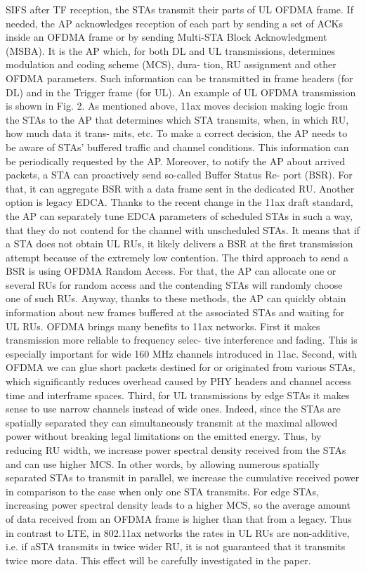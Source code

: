 SIFS after TF reception, the STAs
transmit their parts of UL OFDMA frame. If needed, the
AP acknowledges reception of each part by sending a set of
ACKs inside an OFDMA frame or by sending Multi-STA
Block Acknowledgment (MSBA).
It is the AP which, for both DL and UL transmissions,
determines modulation and coding scheme (MCS), dura-
tion, RU assignment and other OFDMA parameters. Such
information can be transmitted in frame headers (for DL)
and in the Trigger frame (for UL). An example of UL
OFDMA transmission is shown in Fig. 2.
As mentioned above, 11ax moves decision making logic
from the STAs to the AP that determines which STA
transmits, when, in which RU, how much data it trans-
mits, etc. To make a correct decision, the AP needs to
be aware of STAs’ buffered traffic and channel conditions.
This information can be periodically requested by the
AP. Moreover, to notify the AP about arrived packets,
a STA can proactively send so-called Buffer Status Re-
port (BSR). For that, it can aggregate BSR with a data
frame sent in the dedicated RU. Another option is legacy
EDCA. Thanks to the recent change in the 11ax draft
standard, the AP can separately tune EDCA parameters
of scheduled STAs in such a way, that they do not contend
for the channel with unscheduled STAs. It means that
if a STA does not obtain UL RUs, it likely delivers a
BSR at the first transmission attempt because of the
extremely low contention. The third approach to send
a BSR is using OFDMA Random Access. For that, the
AP can allocate one or several RUs for random access
and the contending STAs will randomly choose one of
such RUs. Anyway, thanks to these methods, the AP can
quickly obtain information about new frames buffered at
the associated STAs and waiting for UL RUs.
OFDMA brings many benefits to 11ax networks. First
it makes transmission more reliable to frequency selec-
tive interference and fading. This is especially important
for wide 160 MHz channels introduced in 11ac. Second,
with OFDMA we can glue short packets destined for or
originated from various STAs, which significantly reduces
overhead caused by PHY headers and channel access time
and interframe spaces. Third, for UL transmissions by edge
STAs it makes sense to use narrow channels instead of wide
ones. Indeed, since the STAs are spatially separated they
can simultaneously transmit at the maximal allowed power
without breaking legal limitations on the emitted energy.
Thus, by reducing RU width, we increase power spectral
density received from the STAs and can use higher MCS.
In other words, by allowing numerous spatially separated
STAs to transmit in parallel, we increase the cumulative
received power in comparison to the case when only one
STA transmits. For edge STAs, increasing power spectral
density leads to a higher MCS, so the average amount
of data received from an OFDMA frame is higher than
that from a legacy. Thus in contrast to LTE, in 802.11ax
networks the rates in UL RUs are non-additive, i.e. if aSTA transmits in twice wider RU, it is not guaranteed that
it transmits twice more data. This effect will be carefully
investigated in the paper.

